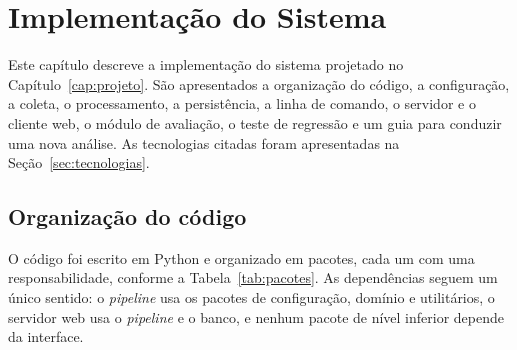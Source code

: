 \chapter[IMPLEMENTAÇÃO DO SISTEMA]{Implementação do Sistema}
\label{cap:implementacao}

Este capítulo descreve a implementação do sistema projetado no
Capítulo~\ref{cap:projeto}. São apresentados a organização do código, a
configuração, a coleta, o processamento, a persistência, a linha de comando, o
servidor e o cliente web, o módulo de avaliação, o teste de regressão e um
guia para conduzir uma nova análise. As
tecnologias citadas foram apresentadas na Seção~\ref{sec:tecnologias}.

\section{Organização do código}
\label{sec:organizacao}

O código foi escrito em Python e organizado em pacotes, cada um com uma
responsabilidade, conforme a Tabela~\ref{tab:pacotes}. As dependências seguem
um único sentido: o \textit{pipeline} usa os pacotes de configuração, domínio e
utilitários, o servidor web usa o \textit{pipeline} e o banco, e nenhum pacote
de nível inferior depende da interface.

